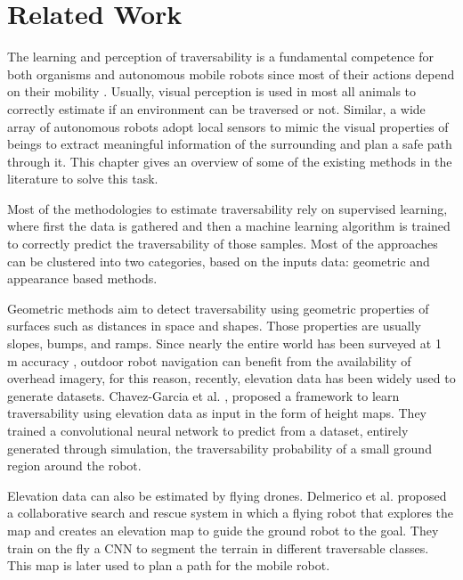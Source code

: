 \documentclass[../document.tex]{subfiles}
\begin{document}
\chapter{Related Work}
\label{chap: related-work}
The learning and perception of traversability is
a fundamental competence for both organisms and autonomous mobile robots since most of their
actions depend on their mobility \cite{ugur2010traversability}. 
Usually, visual perception is used in most all animals to correctly estimate if an environment can be traversed or not.
Similar, a wide array of autonomous robots adopt local sensors to mimic the visual properties of beings to extract meaningful information of the surrounding and plan a safe path through it. This chapter gives an overview of some of the existing methods in the literature to solve this task.

Most of the methodologies to estimate traversability rely on supervised learning, where first the data is gathered and then a machine learning algorithm is trained to correctly predict the traversability of those samples.
Most of the approaches can be clustered into two categories, based on the inputs data: geometric and appearance based methods. 

Geometric methods aim to detect traversability using geometric properties of surfaces such as distances in space and shapes. Those properties are usually slopes, bumps, and ramps. Since nearly the entire world has been surveyed at 1 m accuracy \cite{sofman2006improving}, 
outdoor robot navigation can benefit from the availability of overhead imagery, for this reason, recently, elevation data has been widely used to generate datasets. Chavez-Garcia et al. \cite{omar2018traversability}, proposed a framework to learn traversability using elevation data as input in the form of height maps. They trained a convolutional neural network to predict from a dataset, entirely generated through simulation, the traversability probability of a small ground region around the robot.

Elevation data can also be estimated by flying drones. Delmerico et al. \cite{delmerico2016active} proposed a collaborative search and rescue system in which a flying robot that explores the map and creates an elevation map to guide the ground robot to the goal. They train on the fly a CNN to segment the terrain in different traversable classes. This map is later used to plan a path for the mobile robot.
\end{document}
